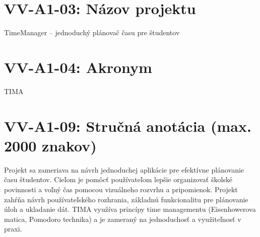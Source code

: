 \documentclass[12pt,a4paper]{article}
\begin{document}
\section*{VV-A1-03: Názov projektu}
TimeManager – jednoduchý plánovač času pre študentov

\section*{VV-A1-04: Akronym}
TIMA

\section*{VV-A1-09: Stručná anotácia (max. 2000 znakov)}
Projekt sa zameriava na návrh jednoduchej aplikácie pre efektívne plánovanie času študentov. 
Cieľom je pomôcť používateľom lepšie organizovať školské povinnosti a voľný čas pomocou vizuálneho rozvrhu a pripomienok.
Projekt zahŕňa návrh používateľského rozhrania, základnú funkcionalitu pre plánovanie úloh a 
ukladanie dát. TIMA využíva princípy time managementu (Eisenhowerova matica, Pomodoro technika) 
a je zameraný na jednoduchosť a využiteľnosť v praxi.
\end{document}
